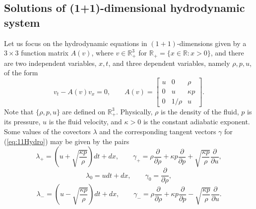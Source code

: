 \documentclass[12pt]{article}
\theoremstyle{plain}
\theoremstyle{definition}
\numberwithin{equation}{section}
\begin{document}
\subsection{Solutions of (1+1)-dimensional hydrodynamic system}
Let us focus on the hydrodynamic equations in $(1+1)$-dimensions given by a $3\times 3$ function matrix $A(v)$, where $v\in \mathbb{R}_+^3$ for $\mathbb{R}_+=\{x\in \mathbb{R}:x> 0\}$, and there are two independent variables, $x,t$, and three dependent variables, namely $\rho,p,u$, of the form
\begin{equation}\label{eq:11Hydro}
v_t-A(v)v_x=0,\qquad A(v)=\left[\begin{array}{ccc}u&0&\rho\\0&u&\kappa p\\0&1/\rho &u
\end{array}\right].
\end{equation}
Note that  $\{\rho,p,u\}$ are defined on $\mathbb{R}_+^3$. Physically, $\rho$ is the density of the fluid, $p$ is its pressure,  $u$ is the fluid velocity, and $\kappa>0$ is the constant adiabatic exponent.  Some values of the covectors $\lambda$  and the corresponding tangent vectors $\gamma$ for (\ref{eq:11Hydro}) may be given by the pairs
$$
\lambda_+ =\left(u+\sqrt{\frac{\kappa p}{\rho}}\right)dt+dx,\qquad \gamma_+=\rho\frac{\partial}{\partial \rho}+\kappa p\frac{\partial}{\partial p}+\sqrt{\frac{\kappa p}{\rho}}\frac{\partial}{\partial u} ,
$$
$$
\lambda_0 =udt+dx,\qquad \gamma_0=\frac{\partial}{\partial \rho}, 
$$
$$
\lambda_- =\left(u-\sqrt{\frac{\kappa p}{\rho}}\right)dt+dx,\qquad \gamma_-=\rho\frac{\partial}{\partial \rho}+\kappa p\frac{\partial}{\partial p}-\sqrt{\frac{\kappa p}{\rho}}\frac{\partial}{\partial u} .
$$
\end{document}
